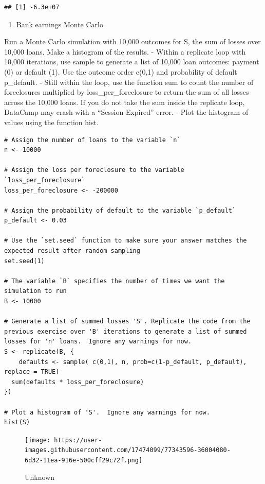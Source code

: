 \documentclass[
]{article}
\providecommand{\tightlist}{%
  \setlength{\itemsep}{0pt}\setlength{\parskip}{0pt}}
\begin{document}
\begin{verbatim}
## [1] -6.3e+07
\end{verbatim}

\begin{enumerate}
\def\labelenumi{\arabic{enumi}.}
\setcounter{enumi}{1}
\tightlist
\item
  Bank earnings Monte Carlo
\end{enumerate}

Run a Monte Carlo simulation with 10,000 outcomes for S, the sum of
losses over 10,000 loans. Make a histogram of the results. - Within a
replicate loop with 10,000 iterations, use sample to generate a list of
10,000 loan outcomes: payment (0) or default (1). Use the outcome order
c(0,1) and probability of default p\_default. - Still within the loop,
use the function sum to count the number of foreclosures multiplied by
loss\_per\_foreclosure to return the sum of all losses across the 10,000
loans. If you do not take the sum inside the replicate loop, DataCamp
may crash with a ``Session Expired'' error. - Plot the histogram of
values using the function hist.

\begin{verbatim}
# Assign the number of loans to the variable `n`
n <- 10000

# Assign the loss per foreclosure to the variable `loss_per_foreclosure`
loss_per_foreclosure <- -200000

# Assign the probability of default to the variable `p_default`
p_default <- 0.03

# Use the `set.seed` function to make sure your answer matches the expected result after random sampling
set.seed(1)

# The variable `B` specifies the number of times we want the simulation to run
B <- 10000

# Generate a list of summed losses 'S'. Replicate the code from the previous exercise over 'B' iterations to generate a list of summed losses for 'n' loans.  Ignore any warnings for now.
S <- replicate(B, {
    defaults <- sample( c(0,1), n, prob=c(1-p_default, p_default), replace = TRUE) 
  sum(defaults * loss_per_foreclosure)
})

# Plot a histogram of 'S'.  Ignore any warnings for now.
hist(S)
\end{verbatim}

\begin{figure}
\centering
\texttt{[image: https://user-images.githubusercontent.com/17474099/77343596-36004080-6d32-11ea-916e-500cff29c72f.png]}
\caption{Unknown}
\end{figure}
\end{document}
